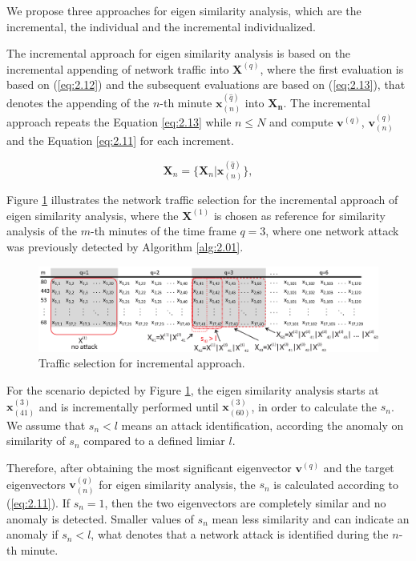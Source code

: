 We propose three approaches for eigen similarity analysis, which are the incremental, the individual and the incremental individualized.

The incremental approach for eigen similarity analysis is based on the incremental appending of network traffic into $\pmb{X}^{(q)}$, where the first evaluation is based on (\ref{eq:2.12}) and the subsequent evaluations are based on (\ref{eq:2.13}), that denotes the appending of the $n$-th minute $\pmb{x}^{(\hat{q})}_{(n)}$ into $\pmb{X_n}$. The incremental approach repeats the Equation \ref{eq:2.13} while $n \leq N$ and compute $\pmb{v}^{(q)}$, $\pmb{v}_{(n)}^{(q)}$ and the Equation \ref{eq:2.11} for each increment.

\begin{equation}\label{eq:2.13}
\pmb{X}_{n} = \{\pmb{X}_{n} | \pmb{x}^{(\hat{q})}_{(n)}\},
\end{equation}

Figure \ref{fig:2.08} illustrates the network traffic selection for the incremental approach of eigen similarity analysis, where the $\pmb{X}^{(1)}$ is chosen as reference for similarity analysis of the $m$-th minutes of the time frame $q=3$, where one network attack was previously detected by Algorithm \ref{alg:2.01}. 

\begin{figure}[h!]
     \includegraphics[width=15cm]{figures/ch2/incremental.eps}
     \caption{Traffic selection for incremental approach.}
     \label{fig:2.08}
\end{figure}

For the scenario depicted by Figure \ref{fig:2.08}, the eigen similarity analysis starts at $\pmb{x}^{(3)}_{(41)}$ and is incrementally performed until $\pmb{x}^{(3)}_{(60)}$, in order to calculate the $s_n$. We assume that $s_n < l$ means an attack identification, according the anomaly on similarity of $s_n$ compared to a defined limiar $l$. 

Therefore, after obtaining the most significant eigenvector $\pmb{v}^{(q)}$ and the target eigenvectors $\pmb{v}_{(n)}^{(q)}$ for eigen similarity analysis, the $s_n$ is calculated according to (\ref{eq:2.11}). If $s_n = 1$, then the two eigenvectors are completely similar and no anomaly is detected. Smaller values of $s_n$ mean less similarity and can indicate an anomaly if $s_n < l$, what denotes that a network attack is identified during the $n$-th minute. 

